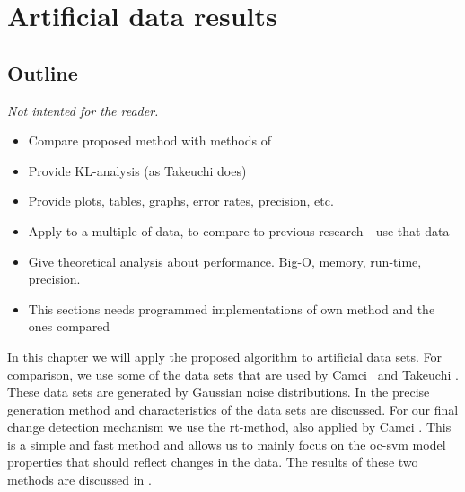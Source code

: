 
\chapter{Artificial data results}

\label{Chapter5} %


\section{Outline}
\emph{Not intented for the reader.}
\begin{itemize}
  \item Compare proposed method with methods of 
  \item Provide KL-analysis (as Takeuchi does)
  \item Provide plots, tables, graphs, error rates, precision, etc.
  \item Apply to a multiple of data, to compare to previous research - use that data
  \item Give theoretical analysis about performance. Big-O, memory, run-time, precision.
  \item This sections needs programmed implementations of own method and the ones compared
\end{itemize}

In this chapter we will apply the proposed algorithm to artificial data sets.
For comparison, we use some of the data sets that are used by Camci~\cite{camci2010change} and Takeuchi \etal \cite{takeuchi2006unifying}.
These data sets are generated by Gaussian noise distributions.
In  the precise generation method and characteristics of the data sets are discussed.
For our final change detection mechanism we use the \gls{rt}-method, also applied by Camci \cite{camci2010change}.
This is a simple and fast method and allows us to mainly focus on the \gls{oc-svm} model properties that should reflect changes in the data.
The results of these two methods are discussed in .




